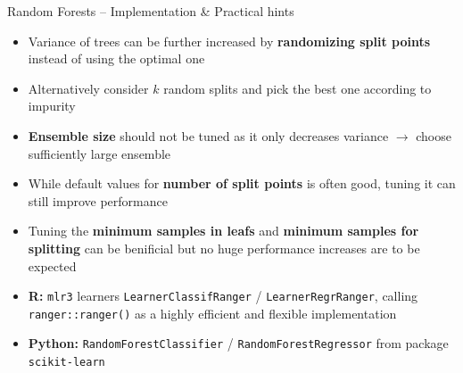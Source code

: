
\begin{frame}{Random Forests -- Implementation \& Practical hints}

\begin{itemize}
    \item Variance of trees can be further increased by \textbf{randomizing split points} instead of using the optimal one
    \item Alternatively consider $k$ random splits and pick the best one according to impurity 
\end{itemize}

\medskip

\begin{itemize}
    \item \textbf{Ensemble size} should not be tuned as it only decreases variance $\longrightarrow$ choose sufficiently large ensemble
    \item While default values for \textbf{number of split points} is often good, tuning it can still improve performance
    \item Tuning the \textbf{minimum samples in leafs} and \textbf{minimum samples for splitting} can be benificial but no huge performance increases are to be expected 
\end{itemize}

\medskip


\begin{itemize}
  \item \textbf{R:} \texttt{mlr3} learners \texttt{LearnerClassifRanger} / 
    \texttt{LearnerRegrRanger}, calling \texttt{ranger::ranger()} as a highly efficient and flexible implementation
  \item \textbf{Python:} \texttt{RandomForestClassifier} / 
  \texttt{RandomForestRegressor} from package \texttt{scikit-learn}
\end{itemize}

\end{frame}


